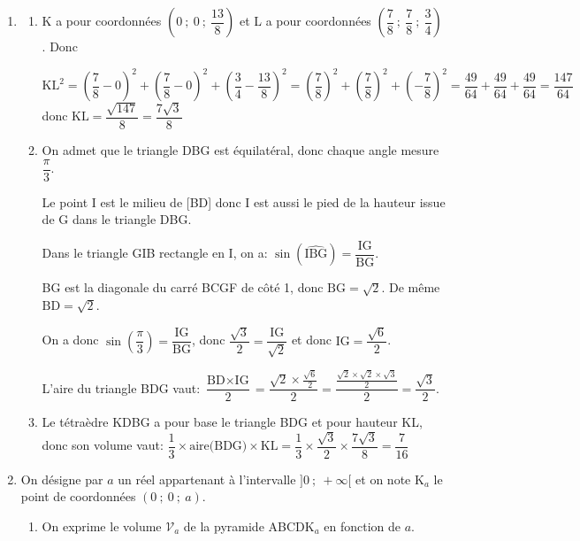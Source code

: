 \documentclass[10pt]{article}
\begin{document}
\begin{enumerate}
\begin{enumerate}
Donc le point L est le projeté orthogonal du point K sur le plan (BDG).
	\end{enumerate}

\item 
	\begin{enumerate}
		\item
K a pour coordonnées $\left(0~;~0~;~\dfrac{13}{8}\right)$ et L a pour coordonnées $\left(\dfrac78~;~\dfrac78~;~\dfrac34\right)$. Donc

$\text{KL}^2 = \left (\dfrac{7}{8}-0 \right )^2 + \left ( \dfrac{7}{8}-0 \right )^2 + \left ( \dfrac{3}{4} - \dfrac{13}{8}\right )^2
= \left (\dfrac{7}{8}\right )^2 + \left ( \dfrac{7}{8}\right )^2 + \left (  - \dfrac{7}{8}\right )^2
= \dfrac{49}{64} + \dfrac{49}{64} + \dfrac{49}{64}
= \dfrac{147}{64}$\\
donc $\text{KL} = \dfrac{\sqrt{147}}{8}=\dfrac{7\sqrt{3}}{8}$
		
		\item On admet que le triangle DBG est équilatéral, donc chaque angle mesure $\dfrac{\pi}{3}$.

Le point I est le milieu de [BD] donc I est aussi le pied de la hauteur issue de G dans le triangle DBG.

Dans le triangle GIB rectangle en I, on a:
$\sin \left ( \widehat{\text{IBG}} \right ) = \dfrac{\text{IG}}{\text{BG}}$.

BG est la diagonale du carré BCGF de côté 1, donc $\text{BG}=\sqrt{2}$.
De même $\text{BD}=\sqrt{2}$.
		
On a donc $\sin \left ( \dfrac{\pi}{3} \right ) = 	\dfrac{\text{IG}}{\text{BG}}$, donc $\dfrac{\sqrt{3}}{2}= \dfrac{\text{IG}}{\sqrt{2}}$ et donc $\text{IG} = \dfrac{\sqrt{6}}{2}$.

L'aire du triangle BDG vaut:
$\dfrac{\text{BD} \times \text{IG}}{2}=\dfrac{\sqrt{2}\times \frac{\sqrt{6}}{2}}{2}
= \dfrac{ \frac{\sqrt{2}\times \sqrt{2} \times \sqrt{3}}{2}}{2}= \dfrac{\sqrt{3}}{2}$.
		
		\item Le tétraèdre KDBG a pour base le triangle BDG et pour hauteur KL, donc son volume vaut:	
$\dfrac{1}{3}\times \text{aire(BDG)}\times \text{KL}
= \dfrac{1}{3}\times \dfrac{\sqrt{3}}{2}\times \dfrac{7\sqrt{3}}{8}
= \dfrac{7}{16}$		






\end{enumerate}

\item On désigne par $a$ un réel appartenant à l'intervalle $]0~;~+\infty[$ et on note K$_a$ le point de coordonnées $(0~;~0~;~a)$.
	\begin{enumerate}
		\item On exprime le volume $\mathcal{V}_a$ de la pyramide ABCDK$_a$ en fonction de $a$.
		

\end{enumerate}
\end{enumerate}
\end{document}
